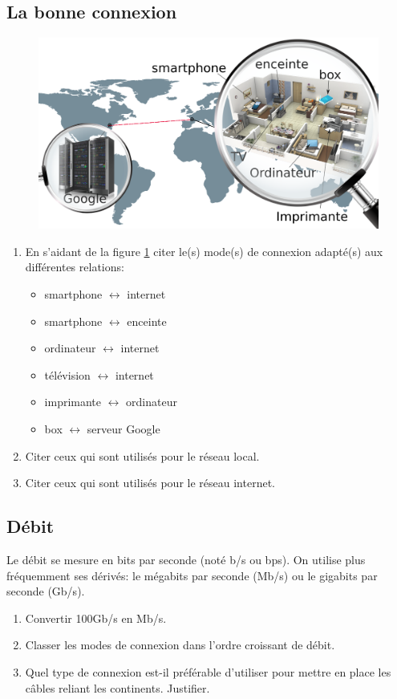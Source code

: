 \documentclass[a4paper,11pt]{article}
\begin{document}
\begin{Form}
\subsection{La bonne connexion}
\begin{figure}[!h]
\centering
\includegraphics[width=17cm]{ressources/bonne-connexion.png}
\label{connexion}
\end{figure}
\begin{activite}
\begin{enumerate}
\item En s'aidant de la figure \ref{connexion} citer le(s) mode(s) de connexion adapté(s) aux différentes relations:
\begin{itemize}
\item smartphone $\longleftrightarrow$ internet
\item smartphone $\longleftrightarrow$ enceinte
\item ordinateur $\longleftrightarrow$ internet
\item télévision $\longleftrightarrow$ internet
\item imprimante $\longleftrightarrow$ ordinateur
\item box $\longleftrightarrow$ serveur Google
\end{itemize}
\item Citer ceux qui sont utilisés pour le réseau local.
\item Citer ceux qui sont utilisés pour le réseau internet.
\end{enumerate}
\end{activite}
\subsection{Débit}
Le débit se mesure en bits par seconde (noté b/s ou bps). On utilise plus fréquemment ses dérivés: le mégabits par seconde (Mb/s) ou le gigabits par seconde (Gb/s).
\begin{activite}
\begin{enumerate}
\item Convertir 100Gb/s en Mb/s.
\item Classer les modes de connexion dans l'ordre croissant de débit.
\item Quel type de connexion est-il préférable d'utiliser pour mettre en place les câbles reliant les continents. Justifier.
\end{enumerate}
\end{activite}

\end{Form}
\end{document}
